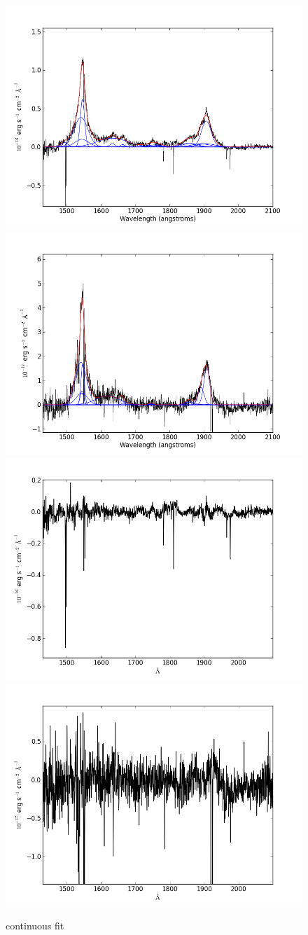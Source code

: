\documentclass[usenatbib]{mn2e}
\begin{document}
\newpage


\begin{figure}
\begin{center}
\includegraphics[width=0.46\linewidth,angle=0]{C_14.png}
\vspace{5mm}
\includegraphics[width=0.49\linewidth,angle=0]{C_15.png}\\
\includegraphics[width=0.46\linewidth,angle=0]{C_res_14.png}
\hspace{5mm}
\includegraphics[width=0.49\linewidth,angle=0]{C_res_15.png}\\
\end{center} 
\caption{continuous fit \label{fig:landscape}}   
\end{figure}
\end{document}
